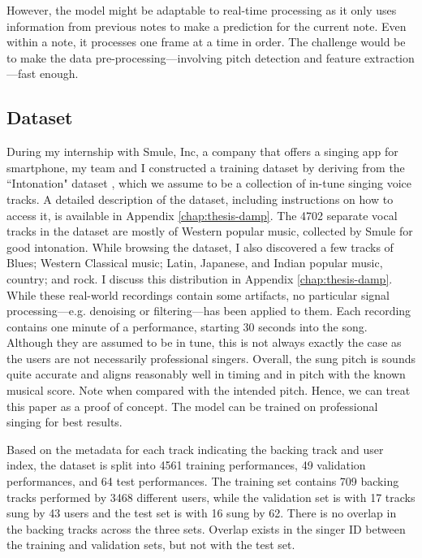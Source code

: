 However, the model might be adaptable to real-time processing as it only uses information from previous notes to make a prediction for the current note. Even within a note, it processes one frame at a time in order. The challenge would be to make the data pre-processing---involving pitch detection and feature extraction---fast enough. 

\subsection{Dataset}
\label{sec:dataset-autotune}
During my internship with Smule, Inc, a company that offers a singing app for smartphone, my team and I constructed a training dataset by deriving from the ``Intonation" dataset \cite{wager2018intonation}, which we assume to be a collection of in-tune singing voice tracks. A detailed description of the dataset, including instructions on how to access it, is available in Appendix \ref{chap:thesis-damp}. The 4702 separate vocal tracks in the dataset are mostly of Western popular music, collected by Smule for good intonation. While browsing the dataset, I also discovered a few tracks of Blues; Western Classical music; Latin, Japanese, and Indian popular music, country; and rock. I discuss this distribution in Appendix \ref{chap:thesis-damp}. While these real-world recordings contain some artifacts, no particular signal processing---e.g. denoising or filtering---has been applied to them. Each recording contains one minute of a performance, starting 30 seconds into the song. Although they are assumed to be in tune, this is not always exactly the case as the users are not necessarily professional singers. Overall, the sung pitch is sounds quite accurate and aligns reasonably well in timing and in pitch with the known musical score. Note when compared with the intended pitch. Hence, we can treat this paper as a proof of concept. The model can be trained on professional singing for best results.

Based on the metadata for each track indicating the backing track and user index, the dataset is split into 4561 training performances, 49 validation performances, and 64 test performances. The training set contains 709 backing tracks performed by 3468 different users, while the validation set is with 17 tracks sung by 43 users and the test set is with 16 sung by 62. There is no overlap in the backing tracks across the three sets. Overlap exists in the singer ID between the training and validation sets, but not with the test set. 

